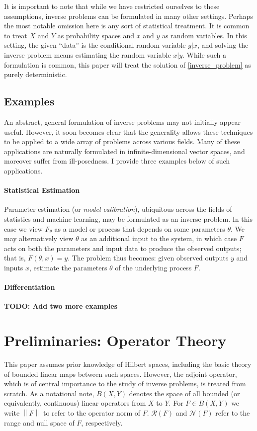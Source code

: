 \documentclass[12pt]{article}
\newcommand*{\norm}[1]{\left\lVert#1\right\rVert}
\begin{document}
It is important to note that while we have restricted ourselves to these assumptions, inverse problems can be formulated in many 
other settings. Perhaps the most notable omission here is any sort of statistical treatment. It is common to treat $X$ and $Y$ as
probability spaces and $x$ and $y$ as random variables. In this setting, the given ``data'' is the conditional random variable 
$y|x$, and solving the inverse problem means estimating the random variable $x|y$. While such a formulation is common, this 
paper will treat the solution of \eqref{inverse_problem} as purely deterministic.  

 \subsection{Examples}
 
 An abstract, general formulation of inverse problems may not initially appear useful. 
 However, it soon becomes clear that the generality allows these techniques to be 
 applied to a wide array of problems across various fields. Many of these applications 
 are naturally formulated in infinite-dimensional vector spaces, and moreover suffer from
  ill-posedness. I provide three examples below of such applications. 
 
 \paragraph*{Statistical Estimation}
 Parameter estimation (or \textit{model calibration}), ubiquitous across the fields of statistics 
 and machine learning, may be formulated as an inverse problem. In this case we view 
 $F_\theta$ as a model or process that depends on some parameters $\theta$. We may
  alternatively view $\theta$ as an additional input to the system, in which case $F$ acts 
  on both the parameters and input data to produce the observed outputs; that is, 
  $F(\theta, x) = y$. The problem thus becomes: given observed outputs $y$ and inputs $x$, 
  estimate the parameters $\theta$ of the underlying process $F$. 
  
  \paragraph*{Differentiation}
 
 \textbf{TODO: Add two more examples}
 
 
 \section{Preliminaries: Operator Theory}
 This paper assumes prior knowledge of Hilbert spaces, including the basic theory of bounded 
 linear maps between such spaces. However, the adjoint operator, which is of central importance 
 to the study of inverse problems, is treated from scratch. As a notational note, $B(X, Y)$ denotes the space of all bounded
 (or equivalently, continuous) linear operators from $X$ to $Y$. For $F \in B(X, Y)$ we write $\norm{F}$
 to refer to the operator norm of $F$. $\mathcal{R}(F)$ and $\mathcal{N}(F)$ refer to the range and 
 null space of $F$, respectively.  
 
\end{document}
